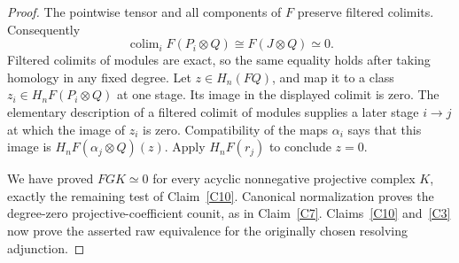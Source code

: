\begin{proof}
The pointwise tensor and all components of $F$ preserve filtered colimits. Consequently
\[
 \mathop{\mathrm{colim}}_i F(P_i\otimes Q)
 \cong F(J\otimes Q)\simeq0.
\]
Filtered colimits of modules are exact, so the same equality holds after taking homology in any fixed degree. Let $z\in H_n(FQ)$, and map it to a class $z_i\in H_nF(P_i\otimes Q)$ at one stage. Its image in the displayed colimit is zero. The elementary description of a filtered colimit of modules supplies a later stage $i\to j$ at which the image of $z_i$ is zero. Compatibility of the maps $\alpha_i$ says that this image is $H_nF(\alpha_j\otimes Q)(z)$. Apply $H_nF(r_j)$ to conclude $z=0$.

We have proved $FGK\simeq0$ for every acyclic nonnegative projective complex $K$, exactly the remaining test of Claim~\ref{C10}. Canonical normalization proves the degree-zero projective-coefficient counit, as in Claim~\ref{C7}. Claims~\ref{C10} and~\ref{C3} now prove the asserted raw equivalence for the originally chosen resolving adjunction.
\end{proof}
